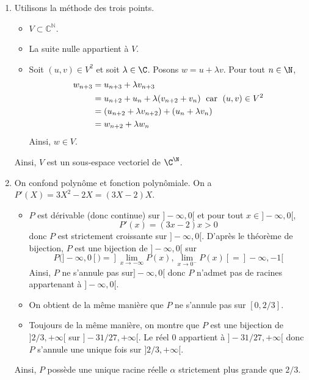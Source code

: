 \documentclass[a4paper,10pt]{report}
\begin{document}
\corr \begin{enumerate}
 \item Utilisons la méthode des trois points.
 \begin{itemize}
 \item $V \subset \mathbb{C}^{\mathbb{N}}$.
 \item La suite nulle appartient à $V$.
 \item Soit $(u,v)\in V^2$ et soit $\lambda\in\C$. Posons $w=u + \lambda v$. Pour tout $n\in\N$, 
 \begin{align*}
 w_{n+3} & =u_{n+3}+\lambda v_{n+3} \\
 & =u_{n+2}+u_n+\lambda(v_{n+2}+v_n) \; \hbox{ car } \; (u,v)\in V^2 \\
 & =(u_{n+2}+\lambda v_{n+2})+(u_n+\lambda v_n) \\
 & =w_{n+2}+\lambda w_n
 \end{align*}
 Ainsi, $w \in V$. 
 \end{itemize}
Ainsi, $V$ est un sous-espace vectoriel de $\C^\N$.
 \item On confond polynôme et fonction polynômiale. On a $P'(X)=3X^2-2X=(3X-2)X$.
 \begin{itemize}
\item $P$ est dérivable (donc continue) sur $]-\infty,0[$ et pour tout $x \in ]-\infty,0[$,
$$ P'(x) = (3x-2)x>0$$
donc $P$ est strictement croissante sur $]-\infty,0[$. D'après le théorème de bijection, $P$ est une bijection de $]-\infty,0[$ sur 
$$ P(]-\infty,0[)=  ]\lim_{x \rightarrow - \infty} P(x), \lim_{x \rightarrow 0^{-}} P(x)[=   ]-\infty,-1[$$
Ainsi, $P$ ne s'annule pas sur$]-\infty,0[$ donc $P$ n'admet pas de racines appartenant à $]-\infty,0[$.
\item On obtient de la même manière que $P$ ne s'annule pas sur $[0, 2/3]$.
\item Toujours de la même manière, on montre que $P$ est une bijection de $]2/3, + \infty[$ sur $]-31/27,+\infty[$. Le réel $0$ appartient à $]-31/27,+\infty[$ donc $P$ s'annule une unique fois sur $]2/3, + \infty[$.
\end{itemize}
Ainsi, $P$ possède une unique racine réelle $\alpha$ strictement plus grande que $2/3$. 


\end{enumerate}
\end{document}
